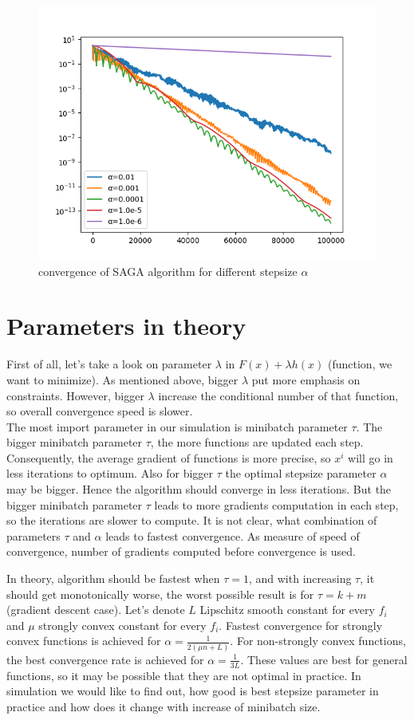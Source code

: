 \documentclass[11pt]{book}
\theoremstyle{definition}
\begin{document}
	\begin{figure}[H]
		\centering
		\includegraphics[width=0.7\linewidth]{saga_convergence.png}
		\caption{convergence of SAGA algorithm for different stepsize $\alpha$}
		\label{fig:saga}
	\end{figure}
	
	\section{Parameters in theory}
	
	First of all, let's take a look on parameter $\lambda$ in $F(x)+\lambda h(x)$ (function, we want to minimize). As mentioned above, bigger $\lambda$ put more emphasis on constraints. However, bigger $\lambda$ increase the conditional number of that function, so overall convergence speed is slower.\\
	
	The most import parameter in our simulation is minibatch parameter $\tau$. The bigger minibatch parameter $\tau$, the more functions are updated each step. Consequently, the average gradient of functions is more precise, so $x^i$ will go in less iterations to optimum. Also for bigger $\tau$ the optimal stepsize parameter $\alpha$ may be bigger. Hence the algorithm should converge in less iterations. But the bigger minibatch parameter $\tau$ leads to more gradients computation in each step, so the iterations are slower to compute.
	It is not clear, what combination of parameters $\tau$ and $\alpha$ leads to fastest convergence. As measure of speed of convergence, number of gradients computed before convergence is used.
	
	In theory, algorithm should be fastest when $\tau=1$, and with increasing $\tau$, it should get monotonically worse, the worst possible result is for $\tau = k+m$ (gradient descent case). Let's denote $L$ Lipschitz smooth constant for every $f_i$ and $\mu$ strongly convex constant for every $f_i$. Fastest convergence for strongly convex functions is achieved for $\alpha = \frac{1}{2(\mu n + L)}$. For non-strongly convex functions, the best convergence rate is achieved for $\alpha = \frac{1}{3L}$. These values are best for general functions, so it may be possible that they are not optimal in practice. In simulation we would like to find out, how good is best stepsize parameter in practice and how does it change with increase of minibatch size.
	
\end{document}
